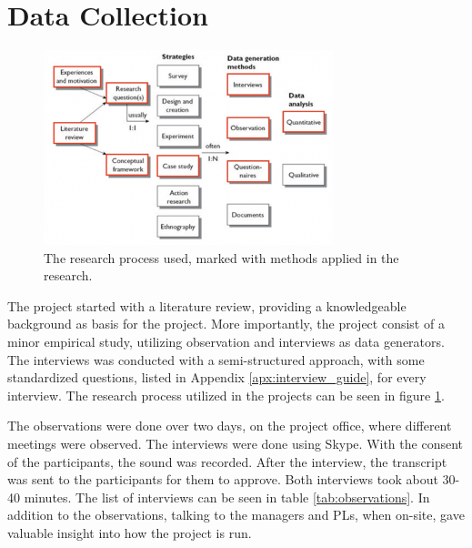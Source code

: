 \section{Data Collection}
\begin{figure}
    \begin{center}
        \includegraphics[width=0.75\textwidth]{fig/empirisk_studie.png}
        \caption{The research process used, marked with methods applied in the research.}
        \label{fig:research_process}
    \end{center}
\end{figure}

The project started with a literature review, providing a knowledgeable background as basis for the project. More importantly, the project consist of a minor empirical study, utilizing observation and interviews as data generators. The interviews was conducted with a semi-structured approach, with some standardized questions, listed in Appendix \ref{apx:interview_guide}, for every interview. The research process utilized in the projects can be seen in figure \ref{fig:research_process}.

The observations were done over two days, on the project office, where different meetings were observed. The interviews were done using Skype. With the consent of the participants, the sound was recorded. After the interview, the transcript was sent to the participants for them to approve. Both interviews took about 30-40 minutes. The list of interviews can be seen in table \ref{tab:observations}. In addition to the observations, talking to the managers and PLs, when on-site, gave valuable insight into how the project is run.

